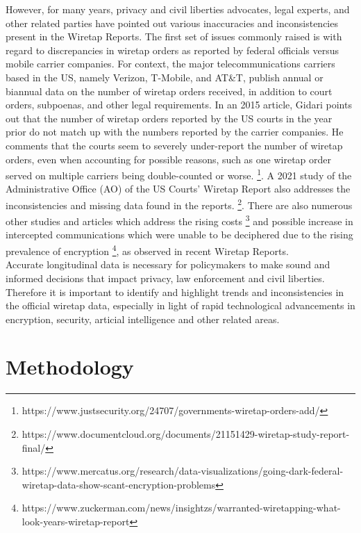\documentclass[11pt,twocolumn]{article} %
\begin{document}
\noindent However, for many years, privacy and civil liberties advocates, legal experts, and other related parties have pointed out various inaccuracies and inconsistencies present in the Wiretap Reports. The first set of issues commonly raised is with regard to discrepancies in wiretap orders as reported by federal officials versus mobile carrier companies. For context, the major telecommunications carriers based in the US, namely Verizon, T-Mobile, and AT\&T, publish annual or biannual data on the number of wiretap orders received, in addition to court orders, subpoenas, and other legal requirements. In an 2015 article, Gidari points out that the number of wiretap orders reported by the US courts in the year prior do not match up with the numbers reported by the carrier companies. He comments that the courts seem to severely under-report the number of wiretap orders, even when accounting for possible reasons, such as one wiretap order served on multiple carriers being double-counted or worse. \footnote{https://www.justsecurity.org/24707/governments-wiretap-orders-add/}. A 2021 study of the Administrative Office (AO) of the US Courts' Wiretap Report also addresses the inconsistencies and missing data found in the reports. \footnote{https://www.documentcloud.org/documents/21151429-wiretap-study-report-final/}. There are also numerous other studies and articles which address the rising costs \footnote{https://www.mercatus.org/research/data-visualizations/going-dark-federal-wiretap-data-show-scant-encryption-problems} and possible increase in intercepted communications which were unable to be deciphered due to the rising prevalence of encryption \footnote{https://www.zuckerman.com/news/insightzs/warranted-wiretapping-what-look-years-wiretap-report}, as observed in recent Wiretap Reports.\\

\noindent Accurate longitudinal data is necessary for policymakers to make sound and informed decisions that impact privacy, law enforcement and civil liberties. Therefore it is important to identify and highlight trends and inconsistencies in the official wiretap data, especially in light of rapid technological advancements in encryption, security, articial intelligence and other related areas.

\section{Methodology}

\label{sec:methodology}
\end{document}

